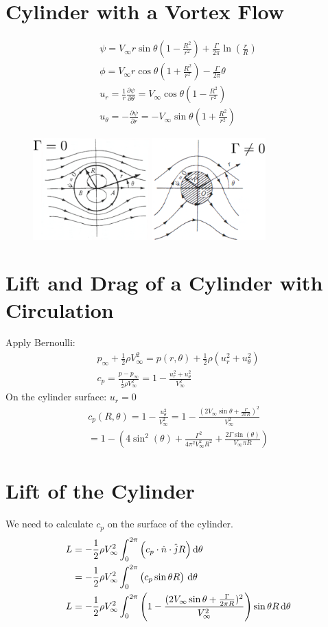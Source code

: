 \documentclass[class=report, crop=false, 12pt,a4paper]{standalone}
\begin{document}
\section{Cylinder with a Vortex Flow}
\begin{gather}
  \psi = V_{\infty}r\sin\theta\left(1-\frac{R^2}{r^2}\right) + \frac{\Gamma}{2\pi}\ln\left(\frac{r}{R}\right)\\
  \phi = V_{\infty}r\cos\theta\left(1+\frac{R^2}{r^2}\right)-\frac{\Gamma}{2\pi}\theta\\
  u_r = \frac{1}{r}\frac{\partial \psi}{\partial \theta} = V_{\infty}\cos\theta\left(1-\frac{R^2}{r^2}\right)\\
  u_{\theta} = -\frac{\partial \psi}{\partial r} = - V_{\infty}\sin\theta\left(1+\frac{R^2}{r^2}\right)
\end{gather}
\begin{figure}[H]
  \centering
  \includegraphics[width = 0.8\textwidth]{../img/diagram25.png}
\end{figure}
\section{Lift and Drag of a Cylinder with Circulation}
Apply Bernoulli:
\begin{gather}
  p_{\infty} + \frac{1}{2}\rho V_{\infty}^2 = p(r,\theta) + \frac{1}{2}\rho(u_r^2+u_{\theta}^2)\\
  c_p = \frac{p - p_{\infty}}{\frac{1}{2}\rho V_{\infty}^2} = 1 - \frac{u_r^2 + u_{\theta}^2}{V_{\infty}^2}
\end{gather}
On the cylinder surface: $u_r = 0$
\begin{gather}
  c_p (R,\theta) = 1 - \frac{u_{\theta}^2}{V_{\infty}^2}=1-\frac{(2V_{\infty}\sin\theta + \frac{\Gamma}{2\pi R})^2}{V_{\infty}^2} \\
  = 1-\left(4\sin^2(\theta)+\frac{\Gamma^2}{4\pi^2V_{\infty}^2R^2}+\frac{2\Gamma\sin(\theta)}{V_{\infty}\pi R}\right)
\end{gather}
\section{Lift of the Cylinder}
We need to calculate $c_p$ on the surface of the cylinder.
\begin{align}
  L &= -\frac{1}{2}\rho V_{\infty}^2\int_{0}^{2\pi} \left(c_p \cdot \hat{n}\cdot\hat{j}R\right)\dif \theta \\
  &= - \frac{1}{2}\rho V_{\infty}^2 \int_{0}^{2\pi} \left(c_p \sin\theta R\right) \,\mathrm{d}\theta \\
  L &= -\frac{1}{2}\rho V_{\infty}^2 \int_{0}^{2\pi} \left(1-\frac{(2V_{\infty}\sin\theta + \frac{\Gamma}{2\pi R})^2}{V_{\infty}^2}\right) \sin\theta R \,\mathrm{d}\theta 
\end{align}
\end{document}
